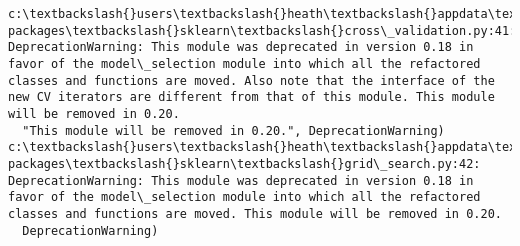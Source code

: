 \documentclass[11pt]{article}
\begin{document}
    \begin{Verbatim}[commandchars=\\\{\}]
c:\textbackslash{}users\textbackslash{}heath\textbackslash{}appdata\textbackslash{}local\textbackslash{}programs\textbackslash{}python\textbackslash{}python36\textbackslash{}lib\textbackslash{}site-packages\textbackslash{}sklearn\textbackslash{}cross\_validation.py:41: DeprecationWarning: This module was deprecated in version 0.18 in favor of the model\_selection module into which all the refactored classes and functions are moved. Also note that the interface of the new CV iterators are different from that of this module. This module will be removed in 0.20.
  "This module will be removed in 0.20.", DeprecationWarning)
c:\textbackslash{}users\textbackslash{}heath\textbackslash{}appdata\textbackslash{}local\textbackslash{}programs\textbackslash{}python\textbackslash{}python36\textbackslash{}lib\textbackslash{}site-packages\textbackslash{}sklearn\textbackslash{}grid\_search.py:42: DeprecationWarning: This module was deprecated in version 0.18 in favor of the model\_selection module into which all the refactored classes and functions are moved. This module will be removed in 0.20.
  DeprecationWarning)

    \end{Verbatim}
\end{document}
